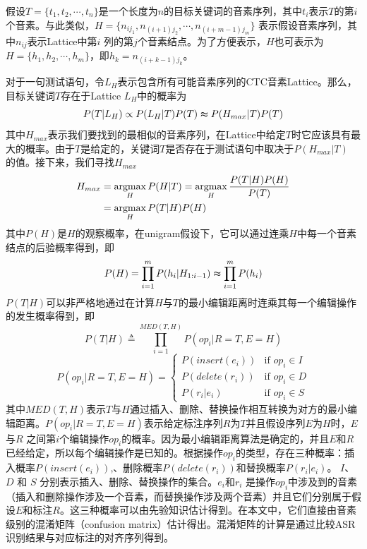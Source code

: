 假设$T=\{t_{1}, t_{2},\cdots,t_{n}\}$是一个长度为$n$的目标关键词的音素序列，其中$t_{i}$表示$T$的第$i$个音素。与此类似，$H=\{n_{ij_{1}},n_{(i+1)j_{2}},\cdots,n_{(i+m-1)j_{m}}\}$ 表示假设音素序列，其中$n_{ij}$表示Lattice中第$i$ 列的第$j$个音素结点。为了方便表示，$H$也可表示为$H=\{h_{1},h_{2},\cdots,h_{m}\}$，即$h_{k}=n_{(i+k-1)j_{k}}$。

对于一句测试语句，令$L_{H}$表示包含所有可能音素序列的CTC音素Lattice。那么，目标关键词$T$存在于Lattice $L_{H}$中的概率为
\begin{equation}
P(T|L_{H}) \propto P(L_{H}|T)P(T) \thickapprox P(H_{max}|T)P(T)
\end{equation}
其中$H_{max}$表示我们要找到的最相似的音素序列，在Lattice中给定$T$时它应该具有最大的概率。由于$T$是给定的，关键词$T$是否存在于测试语句中取决于$P(H_{max}|T)$ 的值。接下来，我们寻找$H_{max}$
\begin{equation}
\label{equ:hlatt}
\begin{split}
H_{max} &= \mathop{\operatorname*{argmax}}_{H}{P(H|T)}=\mathop{\operatorname*{argmax}}_{H}{\frac{P(T|H)P(H)}{P(T)}} \\ &= \mathop{\operatorname*{argmax}}_{H}{P(T|H)P(H)}
\end{split}
\end{equation}
其中$P(H)$是$H$的观察概率，在unigram假设下，它可以通过连乘$H$中每一个音素结点的后验概率得到，即
\begin{equation}
\label{equ:ph}
P(H) = \mathop{\prod}_{i=1}^{m}{P(h_{i}|H_{1:i-1})} \thickapprox \mathop{\prod}_{i=1}^{m}{P(h_{i})}
\end{equation}
$P(T|H)$可以非严格地通过在计算$H$与$T$的最小编辑距离时连乘其每一个编辑操作的发生概率得到，即
\begin{equation}
\label{equ:pth}
P(T|H) \triangleq \mathop{\prod}_{i=1}^{MED(T,H)}{P(op_{i}|R=T,E=H)}
\end{equation}
\begin{equation}
P(op_{i}|R=T,E=H) = \begin{cases}
  P(insert(e_{i})) & \text{if } op_{i} \in I \\
  P(delete(r_{i})) & \text{if } op_{i} \in D \\
  P(r_{i}|e_{i}) & \text{if } op_{i} \in S
\end{cases}
\end{equation}
其中$MED(T,H)$表示$T$与$H$通过插入、删除、替换操作相互转换为对方的最小编辑距离。$P(op_{i}|R=T,E=H)$表示给定标注序列$R$为$T$并且假设序列$E$为$H$时，$E$与$R$ 之间第$i$个编辑操作$op_{i}$的概率。因为最小编辑距离算法是确定的，并且$E$和$R$已经给定，所以每个编辑操作是已知的。根据操作$op_{i}$的类型，存在三种概率：插入概率$P(insert(e_{i}))$,、删除概率$P(delete(r_{i}))$和替换概率$P(r_{i}|e_{i})$。 $I$、 $D$ 和 $S$ 分别表示插入、删除、替换操作的集合。$e_{i}$和$r_{i}$ 是操作$op_{i}$中涉及到的音素（插入和删除操作涉及一个音素，而替换操作涉及两个音素）并且它们分别属于假设$E$和标注$R$。这三种概率可以由先验知识估计得到。在本文中，它们直接由音素级别的混淆矩阵（confusion matrix）估计得出。混淆矩阵的计算是通过比较ASR识别结果与对应标注的对齐序列得到。
